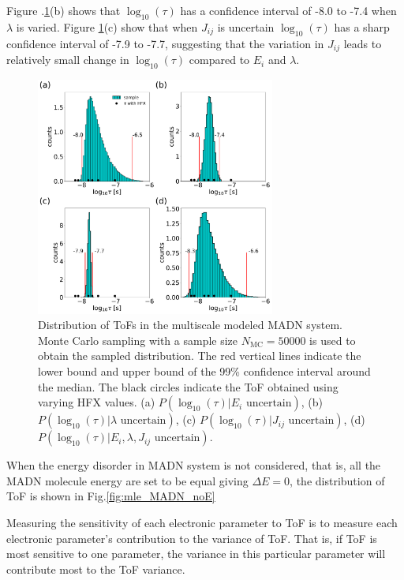 \documentclass[letterpaper,12pt]{article}
\begin{document}
Figure .\ref{fig:mle_MADN_withE}(b) shows that $\log_{10}(\tau)$ has a confidence interval of -8.0 to -7.4 when $\lambda$ is varied. 
Figure \ref{fig:mle_MADN_withE}(c) show that when $J_{ij}$ is uncertain $\log_{10}(\tau)$ has a sharp confidence interval of -7.9 to -7.7, suggesting that the variation in $J_{ij}$ leads to relatively small change in $\log_{10}(\tau)$ compared to $E_i$ and $\lambda$.
%
\begin{figure}[H]
    \centering
    \includegraphics[width=0.70\textwidth]{figs/fig_mle_MADN_withE.pdf}
    \caption{Distribution of ToFs in the multiscale modeled MADN system.
    Monte Carlo sampling with a sample size $N_\text{MC}=50000$ is used to obtain the sampled distribution. The red vertical lines indicate the lower bound and upper bound of the 99\% confidence interval around the median.
    The black circles indicate the ToF obtained using varying HFX values.
    (a) $P(\log_{10}(\tau)|E_i \text{ uncertain})$, 
    (b) $P(\log_{10}(\tau)|\lambda \text{ uncertain})$, 
    (c) $P(\log_{10}(\tau)|J_{ij} \text{ uncertain})$, 
    (d) $P(\log_{10}(\tau)|E_i, \lambda, J_{ij} \text{ uncertain})$. }
    \label{fig:mle_MADN_withE}
\end{figure}
%

When the energy disorder in MADN system is not considered, that is, all the MADN molecule energy are set to be equal giving $\Delta E=0$, the distribution of ToF is shown in Fig.\ref{fig:mle_MADN_noE}

Measuring the sensitivity of each electronic parameter to ToF is to measure each electronic parameter's contribution to the variance of ToF. 
That is, if ToF is most sensitive to one parameter, the variance in this particular parameter will contribute most to the ToF variance. 
\end{document}
